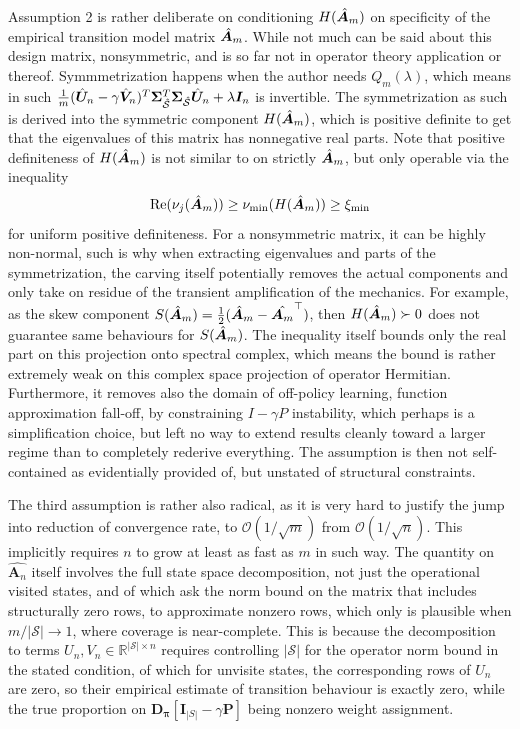Assumption 2 is rather deliberate on conditioning $H(\hat {{\bm{A}}}_m)$ on specificity of the empirical transition model matrix $\hat {{\bm{A}}}_m$. While not much can be said about this design matrix, nonsymmetric, and is so far not in operator theory application or thereof. Symmmetrization happens when the author needs $Q_{m}(\lambda)$, which means in such $\tfrac{1}{m}(\hat {{\bm{U}}}_n - \gamma \hat {{\bm{V}}}_n)^T {\bm{\Sigma}}_{\hat{\mathcal{S}}}^T {\bm{\Sigma}}_{\hat{\mathcal{S}}} \hat {{\bm{U}}}_n + \lambda{\bm{I}}_{n}$ is invertible. The symmetrization as such is derived into the symmetric component $H(\hat {{\bm{A}}}_m)$, which is positive definite to get that the eigenvalues of this matrix has nonnegative real parts. Note that positive definiteness of $H(\hat {{\bm{A}}}_m)$ is not similar to on strictly $\hat {{\bm{A}}}_m$, but only operable via the inequality 
\begin{equation}
    \mathrm{Re}(\nu_{j}(\hat {{\bm{A}}}_m)) \geq \nu_{\min}(H(\hat {{\bm{A}}}_m)) \geq \xi_{\min}
\end{equation}
for uniform positive definiteness. For a nonsymmetric matrix, it can be highly non-normal, such is why when extracting eigenvalues and parts of the symmetrization, the carving itself potentially removes the actual components and only take on residue of the transient amplification of the mechanics. For example, as the skew component $S(\hat {{\bm{A}}}_m)=\frac{1}{2}(\hat {{\bm{A}}}_m - \hat{{\bm{A}}_m}^{\top})$, then $H(\hat {{\bm{A}}}_m)\succ 0$ does not guarantee same behaviours for $S(\hat {{\bm{A}}}_m)$. The inequality itself bounds only the real part on this projection onto spectral complex, which means the bound is rather extremely weak on this complex space projection of operator Hermitian. Furthermore, it removes also the domain of off-policy learning, function approximation fall-off, by constraining $I-\gamma P$ instability, which perhaps is a simplification choice, but left no way to extend results cleanly toward a larger regime than to completely rederive everything. The assumption is then not self-contained as evidentially provided of, but unstated of structural constraints. 

The third assumption is rather also radical, as it is very hard to justify the jump into reduction of convergence rate, to $\mathcal{O}(1/\sqrt{m})$ from $\mathcal{O}(1/\sqrt{n})$. This implicitly requires $n$ to grow at least as fast as $m$ in such way. The quantity on $\hat{\bm{A}_{n}}$ itself involves the full state space decomposition, not just the operational visited states, and of which ask the norm bound on the matrix that includes structurally zero rows, to approximate nonzero rows, which only is plausible when $m/|\mathcal{S}|\to 1$, where coverage is near-complete. This is because the decomposition to terms $U_{n},V_{n}\in\mathbb{R}^{|\mathcal{S}|\times n}$ requires controlling $|\mathcal{S}|$ for the operator norm bound in the stated condition, of which for unvisite states, the corresponding rows of $U_{n}$ are zero, so their empirical estimate of transition behaviour is exactly zero, while the true proportion on $\mathbf{D}_{\bm{\pi}}\left[\mathbf{I}_{|S|} - \gamma \mathbf{P}\right]$ being nonzero weight assignment. 

